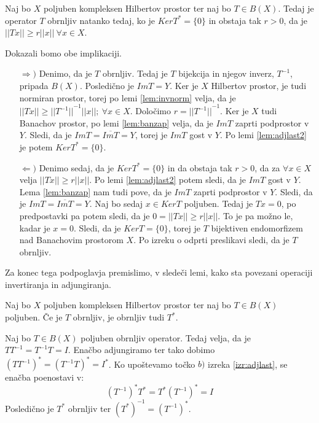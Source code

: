 \documentclass[mat2]{matdelo}
\newcommand{\abs}[1]{\ensuremath{\lvert #1 \rvert}}
\newcommand{\norm}[1]{\abs{\abs{#1}}}
\begin{document}
			\begin{posledica}
				\label{posl:adjinv}
				Naj bo $X$ poljuben kompleksen Hilbertov prostor ter naj bo $T\in B(X)$. Tedaj je operator $T$ obrnljiv natanko tedaj, ko je $KerT^* = \{0\}$ in obstaja tak $r > 0$, da je $\norm{Tx} \geq r\norm{x}~\forall x\in X$.
			\end{posledica}
			
			\begin{dokaz}
				Dokazali bomo obe implikaciji.
				\begin{itemize}
					\item[$\Rightarrow)$] Denimo, da je $T$ obrnljiv. Tedaj je $T$ bijekcija in njegov inverz, $T^{-1}$, pripada $B(X)$. Posledično je $ImT = Y$. Ker je $X$ Hilbertov prostor, je tudi normiran prostor, torej po lemi \ref{lem:invnorm} velja, da je $\norm{Tx}\geq \norm{T^{-1}}^{-1}\norm{x};~\forall x\in X$. Določimo $r = \norm{T^{-1}}^{-1}$. Ker je $X$ tudi Banachov prostor, po lemi \ref{lem:banzap} velja, da je $ImT$ zaprti podprostor v $Y$. Sledi, da je $ImT = \overline{ImT} = Y$, torej je $ImT$ gost v $Y$. Po lemi \ref{lem:adjlast2} je potem $KerT^* = \{0\}$.
					\item[$\Leftarrow)$] Denimo sedaj, da je $KerT^* = \{0\}$ in da obstaja tak $r>0$, da za $\forall x\in X$ velja $\norm{Tx} \geq r\norm{x}$. Po lemi \ref{lem:adjlast2} potem sledi, da je $ImT$ gost v $Y$. Lema \ref{lem:banzap} nam tudi pove, da je $ImT$ zaprti podprostor v $Y$. Sledi, da je $ImT = \overline{ImT} = Y$.
					Naj bo sedaj $x\in KerT$ poljuben. Tedaj je $Tx = 0$, po predpostavki pa potem sledi, da je $0 = \norm{Tx} \geq r\norm{x}$. To je pa možno le, kadar je $x = 0$. Sledi, da je $KerT = \{0\}$, torej je $T$ bijektiven endomorfizem nad Banachovim prostorom $X$. Po izreku o odprti preslikavi sledi, da je $T$ obrnljiv.
				\end{itemize}
			\end{dokaz}
			Za konec tega podpoglavja premislimo, v sledeči lemi, kako sta povezani operaciji invertiranja in adjungiranja.
			\begin{lema}
				\label{lem:adjinv}
				Naj bo $X$ poljuben kompleksen Hilbertov prostor ter naj bo $T\in B(X)$ poljuben. Če je $T$ obrnljiv, je obrnljiv tudi $T^*$.
			\end{lema}
		
			\begin{dokaz}
				Naj bo $T\in B(X)$ poljuben obrnljiv operator. Tedaj velja, da je $TT^{-1} = T^{-1}T = I$. Enačbo adjungiramo ter tako dobimo $(TT^{-1})^* = (T^{-1}T)^* = I^*$. Ko upoštevamo točko $b)$ izreka \ref{izr:adjlast}, se enačba poenostavi v: $$(T^{-1})^*T^* = T^*(T^{-1})^* = I$$
				Posledično je $T^*$ obrnljiv ter $(T^*)^{-1} = (T^{-1})^*$.
			\end{dokaz}
\end{document}
